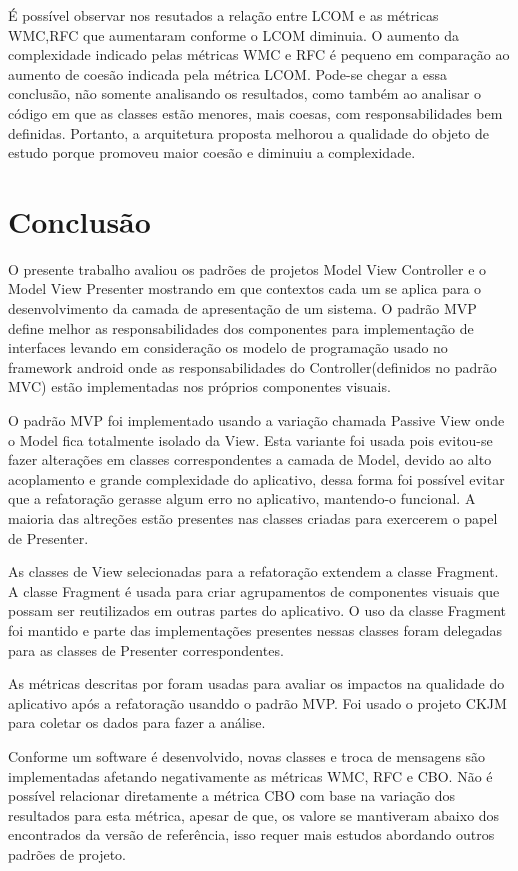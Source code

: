 \documentclass[conference]{IEEEtran}
\begin{document}
É possível observar nos resutados a relação entre LCOM e as métricas 
WMC,RFC que aumentaram conforme o LCOM diminuia. O aumento da complexidade
indicado pelas métricas WMC e RFC é pequeno em comparação ao aumento de
coesão indicada pela métrica LCOM. Pode-se chegar a essa conclusão, não somente
analisando os resultados, como também ao analisar o código em que as classes
estão menores, mais coesas, com responsabilidades bem definidas. Portanto, a
arquitetura proposta melhorou a qualidade do objeto de estudo porque promoveu
maior coesão e diminuiu a complexidade.

\section{Conclusão} 

O presente trabalho avaliou os padrões de projetos Model View Controller e o
Model View Presenter mostrando em que contextos cada um se aplica para o
desenvolvimento da camada de apresentação de um sistema.
O padrão MVP define melhor as responsabilidades dos componentes para
implementação de interfaces levando em consideração os modelo de programação
usado no framework android onde as responsabilidades do Controller(definidos no
padrão MVC) estão implementadas nos próprios componentes visuais.

O padrão MVP foi implementado usando a variação chamada Passive View onde o
Model fica totalmente isolado da View. Esta variante foi usada pois evitou-se
fazer alterações em classes correspondentes a camada de Model, devido ao alto
acoplamento e grande complexidade do aplicativo, dessa forma foi possível evitar
que a refatoração gerasse algum erro no aplicativo, mantendo-o funcional. A
maioria das altreções estão presentes nas classes criadas para exercerem o papel
de Presenter.

As classes de View selecionadas para a refatoração extendem a classe Fragment.
A classe Fragment é usada para criar agrupamentos de componentes visuais que
possam ser reutilizados em outras partes do aplicativo. O uso da classe
Fragment foi mantido e parte das implementações presentes nessas classes foram
delegadas para as classes de Presenter correspondentes.

As métricas descritas por \cite{cksuite} foram usadas para avaliar os
impactos na qualidade do aplicativo após a refatoração usanddo o padrão MVP. Foi
usado o projeto CKJM para coletar os dados para fazer a análise.

Conforme um software é desenvolvido, novas classes e troca de mensagens são
implementadas afetando negativamente as métricas WMC, RFC e CBO. Não é possível
relacionar diretamente a métrica CBO com base na variação dos resultados para
esta métrica, apesar de que, os valore se mantiveram abaixo dos encontrados da
versão de referência, isso requer mais estudos abordando outros padrões de projeto.
\end{document}
